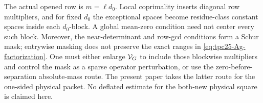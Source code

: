 \begin{remark}
\label{rem:tpc25-skeleton-scope}
The actual opened row is \(m=\ell d_0\).  Local coprimality inserts
diagonal row multipliers, and for fixed \(d_0\) the exceptional spaces
become residue-class constant spaces inside each \(d_0\)-block.  A
global mean-zero condition need not center every such block.  Moreover,
the near-determinant and row-gcd conditions form a Schur mask;
entrywise masking does not preserve the exact ranges in
\eqref{eq:tpc25-Ag-factorization}.  One must either enlarge
\(\mathcal V_G\) to include those blockwise multipliers and control the mask
as a sparse operator perturbation, or use the zero-before-separation
absolute-mass route.  The present paper takes the latter route for the
one-sided physical packet.  No deflated estimate for the both-new
physical square is claimed here.
\end{remark}
